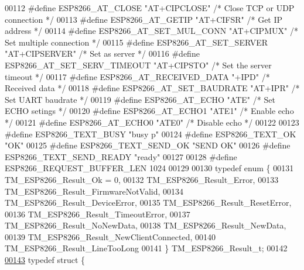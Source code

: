 \begin{DoxyCode}
00112 \textcolor{preprocessor}{#define ESP8266\_AT\_CLOSE            "AT+CIPCLOSE"   }\textcolor{comment}{/* Close TCP or UDP connection */}\textcolor{preprocessor}{}
00113 \textcolor{preprocessor}{#define ESP8266\_AT\_GETIP            "AT+CIFSR"      }\textcolor{comment}{/* Get IP address */}\textcolor{preprocessor}{}
00114 \textcolor{preprocessor}{#define ESP8266\_AT\_SET\_MUL\_CONN     "AT+CIPMUX"     }\textcolor{comment}{/* Set multiple connection */}\textcolor{preprocessor}{}
00115 \textcolor{preprocessor}{#define ESP8266\_AT\_SET\_SERVER       "AT+CIPSERVER"  }\textcolor{comment}{/* Set as server */}\textcolor{preprocessor}{}
00116 \textcolor{preprocessor}{#define ESP8266\_AT\_SET\_SERV\_TIMEOUT "AT+CIPSTO"     }\textcolor{comment}{/* Set the server timeout */}\textcolor{preprocessor}{}
00117 \textcolor{preprocessor}{#define ESP8266\_AT\_RECEIVED\_DATA    "+IPD"          }\textcolor{comment}{/* Received data */}\textcolor{preprocessor}{}
00118 \textcolor{preprocessor}{#define ESP8266\_AT\_SET\_BAUDRATE     "AT+IPR"        }\textcolor{comment}{/* Set UART baudrate */}\textcolor{preprocessor}{}
00119 \textcolor{preprocessor}{#define ESP8266\_AT\_ECHO             "ATE"           }\textcolor{comment}{/* Set ECHO setings */}\textcolor{preprocessor}{}
00120 \textcolor{preprocessor}{#define ESP8266\_AT\_ECHO1            "ATE1"          }\textcolor{comment}{/* Enable echo */}\textcolor{preprocessor}{}
00121 \textcolor{preprocessor}{#define ESP8266\_AT\_ECHO0            "ATE0"          }\textcolor{comment}{/* Disable echo */}\textcolor{preprocessor}{}
00122 
00123 \textcolor{preprocessor}{#define ESP8266\_TEXT\_BUSY           "busy p"}
00124 \textcolor{preprocessor}{#define ESP8266\_TEXT\_OK             "OK"}
00125 \textcolor{preprocessor}{#define ESP8266\_TEXT\_SEND\_OK        "SEND OK"}
00126 \textcolor{preprocessor}{#define ESP8266\_TEXT\_SEND\_READY     "ready"}
00127 
00128 \textcolor{preprocessor}{#define ESP8266\_REQUEST\_BUFFER\_LEN  1024}
00129 
00130 \textcolor{keyword}{typedef} \textcolor{keyword}{enum} \{
00131     TM\_ESP8266\_Result\_Ok = 0,
00132     TM\_ESP8266\_Result\_Error,
00133     TM\_ESP8266\_Result\_FirmwareNotValid,
00134     TM\_ESP8266\_Result\_DeviceError,
00135     TM\_ESP8266\_Result\_ResetError,
00136     TM\_ESP8266\_Result\_TimeoutError,
00137     TM\_ESP8266\_Result\_NoNewData,
00138     TM\_ESP8266\_Result\_NewData,
00139     TM\_ESP8266\_Result\_NewClientConnected,
00140     TM\_ESP8266\_Result\_LineTooLong
00141 \} TM\_ESP8266\_Result\_t;
00142 
\hypertarget{tm__stm32f4__esp8266_8h_source_l00143}{}\hyperlink{struct_t_m___e_s_p8266__t}{00143} \textcolor{keyword}{typedef} \textcolor{keyword}{struct }\{

\end{DoxyCode}
